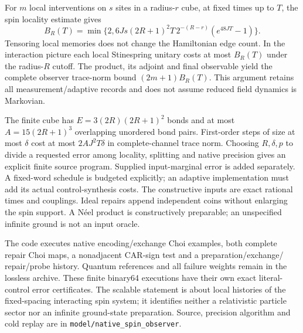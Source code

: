 For $m$ local interventions on $s$ sites in a radius-$r$ cube, at fixed
times up to $T$, the spin locality estimate gives
\[
 B_R(T)=\min\{2,6Js(2R+1)^2T\,2^{-(R-r)}(e^{48JT}-1)\}.
\]
Tensoring local memories does not change the Hamiltonian edge count.
In the interaction picture each local Stinespring unitary costs at most
$B_R(T)$ under the radius-$R$ cutoff. The product, its adjoint and final
observable yield the complete observer trace-norm bound
$(2m+1)B_R(T)$. This argument retains all measurement/adaptive records
and does not assume reduced field dynamics is Markovian.

The finite cube has $E=3(2R)(2R+1)^2$ bonds and at most
$A=15(2R+1)^3$ overlapping unordered bond pairs. First-order steps of
size at most $\delta$ cost at most $2AJ^2T\delta$ in complete-channel
trace norm. Choosing $R,\delta,p$ to divide a requested error among
locality, splitting and native precision gives an explicit finite
source program. Supplied input-marginal error is added separately.
A fixed-word schedule is budgeted explicitly; an adaptive implementation
must add its actual control-synthesis costs.
The constructive inputs are exact rational times and couplings. Ideal
repairs append independent coins without enlarging the spin support.
A N\'eel product is constructively preparable; an unspecified infinite
ground is not an input oracle.

The code executes native encoding/exchange Choi examples, both complete
repair Choi maps, a nonadjacent CAR-sign test and a preparation/exchange/
repair/probe history. Quantum references and all failure weights remain
in the lossless archive. These finite binary64 executions have their
own exact literal-control error certificates. The scalable statement is
about local histories of the fixed-spacing interacting spin system;
it identifies neither a relativistic particle sector nor an infinite
ground-state preparation. Source, precision algorithm and cold replay
are in \texttt{model/native\_spin\_observer}.
